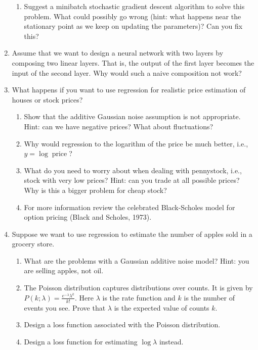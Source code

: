 \documentclass{article}
\begin{document}
\begin{enumerate}[label=\arabic*.]
\begin{enumerate}[label=\arabic*.]
	\item Suggest a minibatch stochastic gradient descent algorithm to solve this problem. What could possibly go wrong (hint: what happens near the stationary point as we keep on updating the parameters)? Can you fix this?
	\end{enumerate}
\item Assume that we want to design a neural network with two layers by composing two linear layers. That is, the output of the first layer becomes the input of the second layer. Why would such a naive composition not work?
\item What happens if you want to use regression for realistic price estimation of houses or stock prices?
	\begin{enumerate}[label=\arabic*.]
	\item Show that the additive Gaussian noise assumption is not appropriate. Hint: can we have negative prices? What about fluctuations?
	\item Why would regression to the logarithm of the price be much better, i.e., $y = \log \operatorname{price}$?
	\item What do you need to worry about when dealing with pennystock, i.e., stock with very low prices? Hint: can you trade at all possible prices? Why is this a bigger problem for cheap stock?
	\item For more information review the celebrated Black-Scholes model for option pricing (Black and Scholes, 1973).
	\end{enumerate}
\item Suppose we want to use regression to estimate the number of apples sold in a grocery store.
	\begin{enumerate}[label=\arabic*.]
	\item What are the problems with a Gaussian additive noise model? Hint: you are selling apples, not oil.
	\item The Poisson distribution captures distributions over counts. It is given by $P(k; \lambda) = \frac{e^{-\lambda} \lambda^k}{k!}$. Here $\lambda$ is the rate function and $k$ is the number of events you see. Prove that $\lambda$ is the expected value of counts $k$.
	\item Design a loss function associated with the Poisson distribution.
	\item Design a loss function for estimating $\log \lambda$ instead.
	\end{enumerate}
\end{enumerate}
\end{document}
